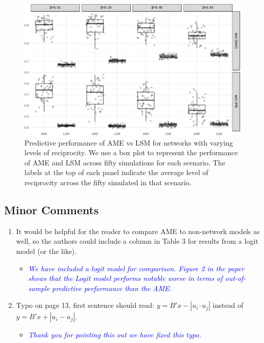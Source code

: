 \begin{enumerate}
\begin{itemize}
\begin{itemize}
{{				}}
			\end{itemize}	
			\begin{figure}[ht]
				\centering
				\includegraphics[width=1\textwidth]{sim2Viz.pdf}
				\caption{Predictive performance of AME vs LSM for networks with varying levels of reciprocity. We use a box plot to represent the performance of AME and LSM across fifty simulations for each scenario. The labels at the top of each panel indicate the average level of reciprocity across the fifty simulated in that scenario.}
				\label{fig:sim_recip}		
			\end{figure}
	\end{itemize}
\end{enumerate}

\subsection{Minor Comments}

\begin{enumerate}
	\item It would be helpful for the reader to compare AME to non-network models as well, so the authors could include a column in Table 3 for results from a logit model (or the like). 
	\begin{itemize}
		\item \textcolor{blue}{ \emph{
		We have included a logit model for comparison. Figure 2 in the paper shows that the Logit model performs notable worse in terms of out-of-sample predictive performance than the AME.
		}}
	\end{itemize}		
	\item Typo on page 13, first sentence should read: $y = B'x - |u_i – u_j|$ instead of $y = B'x + |u_i - u_j|$.
	\begin{itemize}
		\item \textcolor{blue}{ \emph{
		Thank you for pointing this out we have fixed this typo.
		}}
	\end{itemize}		
\end{enumerate}

